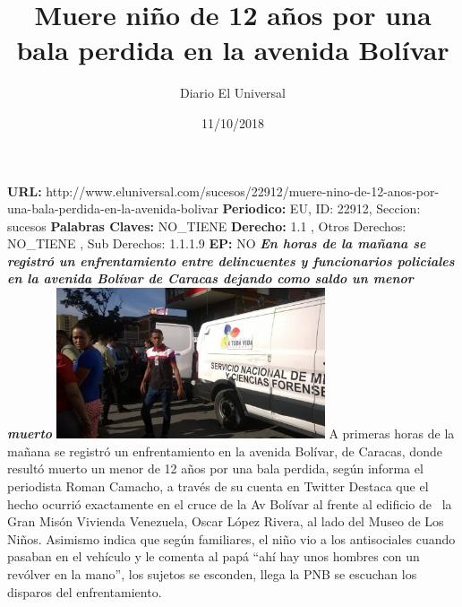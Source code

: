 \documentclass{article}%
\title{\textbf{Muere niño de 12 años por una bala perdida en la avenida Bolívar}}%
\author{Diario El Universal}%
\date{11/10/2018}%
\begin{document}
%
\normalsize%
\maketitle%
\textbf{URL: }%
http://www.eluniversal.com/sucesos/22912/muere{-}nino{-}de{-}12{-}anos{-}por{-}una{-}bala{-}perdida{-}en{-}la{-}avenida{-}bolivar\newline%
%
\textbf{Periodico: }%
EU, %
ID: %
22912, %
Seccion: %
sucesos\newline%
%
\textbf{Palabras Claves: }%
NO\_TIENE\newline%
%
\textbf{Derecho: }%
1.1%
, Otros Derechos: %
NO\_TIENE%
, Sub Derechos: %
1.1.1.9%
\newline%
%
\textbf{EP: }%
NO\newline%
\newline%
%
\textbf{\textit{En horas de la mañana se registró un enfrentamiento entre delincuentes y funcionarios policiales en la avenida Bolívar de Caracas dejando como saldo un menor muerto}}%
\newline%
\newline%
%
\includegraphics[width=300px]{162.jpg}%
\newline%
%
A primeras horas de la mañana se registró un enfrentamiento en la avenida Bolívar, de Caracas, donde resultó muerto un menor de 12 años por una bala perdida, según informa el periodista Roman Camacho, a través de su cuenta en Twitter%
\newline%
%
Destaca que el hecho ocurrió exactamente en el cruce de la Av Bolívar al frente al edificio de~ la Gran Misón Vivienda Venezuela, Oscar López Rivera, al lado del Museo de Los Niños.%
\newline%
%
Asimismo indica que según familiares, el niño vio a los antisociales cuando pasaban en el vehículo y le comenta al papá “ahí hay unos hombres con un revólver en la mano”, los sujetos se esconden, llega la PNB se escuchan los disparos del enfrentamiento.%
\newline%
%
\end{document}
